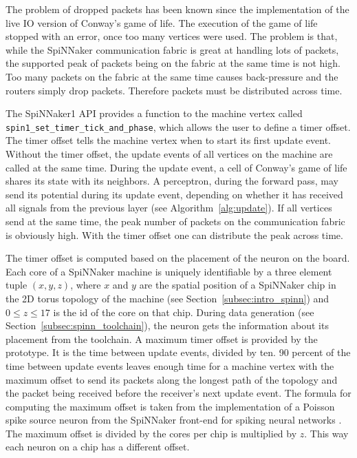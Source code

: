 \documentclass[]{article}
\begin{document}
The problem of dropped packets has been known since the implementation
of the live IO version of Conway's game of life.
The execution of the game of life stopped with an error, once too many
vertices were used.
The problem is that, while the SpiNNaker communication fabric is great
at handling lots of packets, the supported peak of packets being on
the fabric at the same time is not high.
Too many packets on the fabric at the same time causes back-pressure
and the routers simply drop packets.
Therefore packets must be distributed across time.

The SpiNNaker1 API provides a function to the machine vertex called
\texttt{spin1\_set\_timer\_tick\_\-and\_phase}, which allows the user to
define a timer offset.
The timer offset tells the machine vertex when to start its first
update event.
Without the timer offset, the update events of all vertices on the
machine are called at the same time.
During the update event, a cell of Conway's game of life shares its
state with its neighbors.
A perceptron, during the forward pass, may send its potential during
its update event, depending on whether it has received all signals
from the previous layer (see Algorithm~\ref{alg:update}).
If all vertices send at the same time, the peak number of packets on
the communication fabric is obviously high.
With the timer offset one can distribute the peak across time.

The timer offset is computed based on the placement of the neuron on
the board.
Each core of a SpiNNaker machine is uniquely identifiable by a three
element tuple $(x, y, z)$, where $x$ and $y$ are the spatial position
of a SpiNNaker chip in the 2D torus topology of the machine (see
Section~\ref{subsec:intro_spinn}) and $0 \leq z \leq 17$ is the id of
the core on that chip.
During data generation (see Section~\ref{subsec:spinn_toolchain}),
the neuron gets the information about its placement from the
toolchain.
A maximum timer offset is provided by the prototype.
It is the time between update events, divided by ten.
90 percent of the time between update events leaves enough time
for a machine vertex with the maximum offset to send its packets along
the longest path of the topology and the packet being received before
the receiver's next update event.
The formula for computing the maximum offset is taken from
the implementation of a Poisson spike source neuron from the
SpiNNaker front-end for spiking neural networks
\citep{spinnaker_2020c}.
The maximum offset is divided by the cores per chip is multiplied by
$z$.
This way each neuron on a chip has a different offset.
\end{document}
